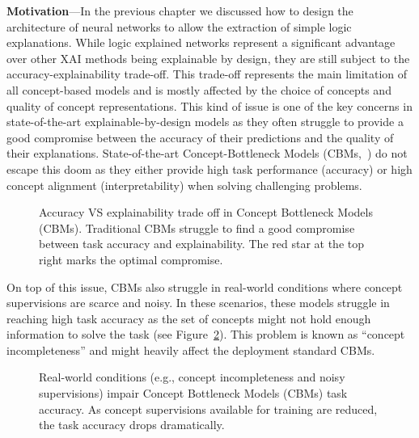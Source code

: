 \textbf{Motivation}---In the previous chapter we discussed how to design the architecture of neural networks to allow the extraction of simple logic explanations. While logic explained networks represent a significant advantage over other XAI methods being explainable by design, they are still subject to the accuracy-explainability trade-off. This trade-off represents the main limitation of all concept-based models and is mostly affected by the choice of concepts and quality of concept representations.
This kind of issue is one of the key concerns in state-of-the-art explainable-by-design models as they often struggle to provide a good compromise between the accuracy of their predictions and the quality of their explanations. State-of-the-art Concept-Bottleneck Models (CBMs,~\cite{koh2020concept}) do not escape this doom as they either provide high task performance (accuracy) or high concept alignment (interpretability) when solving challenging problems.
\begin{figure}[H]
\caption{Accuracy VS explainability trade off in Concept Bottleneck Models (CBMs). Traditional CBMs struggle to find a good compromise between task accuracy and explainability. The red star at the top right marks the optimal compromise.}
\label{fig:cbm_tradeoff}
\end{figure}
On top of this issue, CBMs also struggle in real-world conditions where concept supervisions are scarce and noisy. In these scenarios, these models struggle in reaching high task accuracy as the set of concepts might not hold enough information to solve the task (see Figure~\ref{fig:cbm_real_world}). This problem is known as ``concept incompleteness'' and might heavily affect the deployment standard CBMs.
\begin{figure}[H]
\caption{Real-world conditions (e.g., concept incompleteness and noisy supervisions) impair Concept Bottleneck Models (CBMs) task accuracy. As concept supervisions available for training are reduced, the task accuracy drops dramatically.}
\label{fig:cbm_real_world}
\end{figure}
